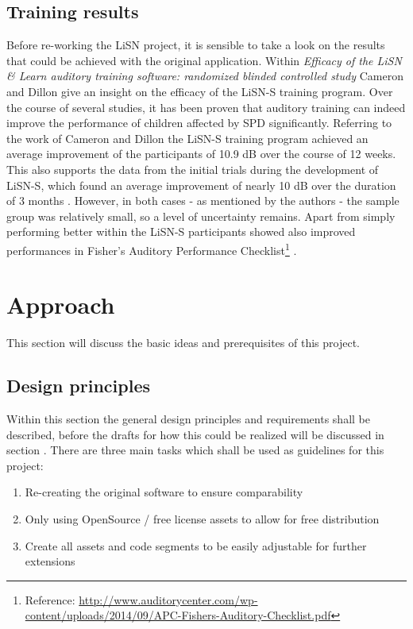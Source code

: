 \documentclass[a4paper,11pt]{article}%
\renewcommand{\\}{\vspace*{0.5\baselineskip} \newline}
\begin{document}
\subsection{Training results}
Before re-working the \ac{LiSN}  project, it is sensible to take a look on the results that could be achieved with the original application. Within \textit{Efficacy of the LiSN \& Learn auditory training software: randomized
blinded controlled study} \cite{LiSN-B} Cameron and Dillon give an insight on the efficacy of the \ac{LiSN-S} training program.
\newline
\newline
Over the course of several studies, it has been proven that auditory training can indeed improve the performance of children affected by \ac{SPD} significantly. Referring to the work of Cameron and Dillon the \ac{LiSN-S} training program achieved an average improvement of the participants of 10.9 dB over the course of 12 weeks. This also supports the data from the initial trials during the development of \ac{LiSN-S}, which found an average improvement of nearly 10 dB over the duration of 3 months \cite{LiSN-A}. However, in both cases - as mentioned by the authors - the sample group was relatively small, so a level of uncertainty remains.
\newline
\newline
Apart from simply performing better within the \ac{LiSN-S} participants showed also improved performances in Fisher's Auditory Performance Checklist\footnote{Reference: \url{http://www.auditorycenter.com/wp-content/uploads/2014/09/APC-Fishers-Auditory-Checklist.pdf}} \cite{LiSN-B}.
\newline
\newline

\section{Approach}
\label{sec:approach}
This section will discuss the basic ideas and prerequisites of this project.


\subsection{Design principles}
Within this section the general design principles and requirements shall be described, before the drafts for how this could be realized will be discussed in section .
\newline
\newline
There are three main tasks which shall be used as guidelines for this project:
\begin{enumerate}
\item Re-creating the original software to ensure comparability
\item Only using OpenSource / free license assets to allow for free distribution
\item Create all assets and code segments to be easily adjustable for further extensions
\end{enumerate}
\end{document}

